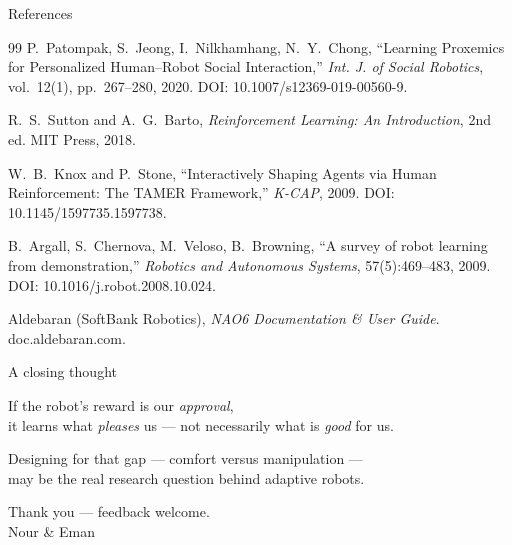 \documentclass[aspectratio=169,10pt]{beamer}
\begin{document}
\begin{frame}[allowframebreaks]{References}
\begin{thebibliography}{99}
     P.\ Patompak, S.\ Jeong, I.\ Nilkhamhang, N.\ Y.\ Chong,
      ``Learning Proxemics for Personalized Human--Robot Social Interaction,''
      \emph{Int. J. of Social Robotics}, vol.\ 12(1), pp.\ 267--280, 2020.
      DOI: 10.1007/s12369-019-00560-9.

     R.\ S.\ Sutton and A.\ G.\ Barto,
      \emph{Reinforcement Learning: An Introduction}, 2nd ed. MIT Press, 2018.

     W.\ B.\ Knox and P.\ Stone,
      ``Interactively Shaping Agents via Human Reinforcement: The TAMER Framework,''
      \emph{K-CAP}, 2009. DOI: 10.1145/1597735.1597738.

     B.\ Argall, S.\ Chernova, M.\ Veloso, B.\ Browning,
      ``A survey of robot learning from demonstration,''
      \emph{Robotics and Autonomous Systems}, 57(5):469--483, 2009.
      DOI: 10.1016/j.robot.2008.10.024.

     Aldebaran (SoftBank Robotics),
      \emph{NAO6 Documentation \& User Guide}. doc.aldebaran.com.

  \end{thebibliography}
\end{frame}

\begin{frame}[standout]
  A closing thought
  \vspace{1.2em}

  {\large If the robot's reward is our \emph{approval},\\
  it learns what \emph{pleases} us --- not necessarily what is \emph{good} for us.}
  \vspace{1.2em}

  {\normalsize Designing for that gap --- comfort versus manipulation --- \\ may be the real research question behind adaptive robots.}
\end{frame}

\begin{frame}[standout]
  Thank you --- feedback welcome.\\[0.4em]
  {\normalsize Nour \& Eman}
\end{frame}

\appendix
\end{document}
